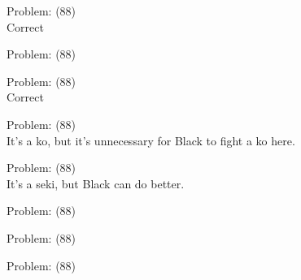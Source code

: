 \documentclass[11pt]{article}
\begin{document}
\begin{minipage}[t]{0.5\textwidth}
  {\centering
  
Problem: (88)\\
Correct\\
  }
\end{minipage}
\begin{minipage}[t]{0.5\textwidth}
  {\centering
  
Problem: (88)\\
  }
\end{minipage}
\begin{minipage}[t]{0.5\textwidth}
  {\centering
  
Problem: (88)\\
Correct\\
  }
\end{minipage}
\begin{minipage}[t]{0.5\textwidth}
  {\centering
  
Problem: (88)\\
It's a ko, but it's unnecessary for Black to fight a ko here.\\
  }
\end{minipage}
\begin{minipage}[t]{0.5\textwidth}
  {\centering
  
Problem: (88)\\
It's a seki, but Black can do better.\\
  }
\end{minipage}
\begin{minipage}[t]{0.5\textwidth}
  {\centering
  
Problem: (88)\\
  }
\end{minipage}
\begin{minipage}[t]{0.5\textwidth}
  {\centering
  
Problem: (88)\\
  }
\end{minipage}
\begin{minipage}[t]{0.5\textwidth}
  {\centering
  
Problem: (88)\\
  }
\end{minipage}
\end{document}
